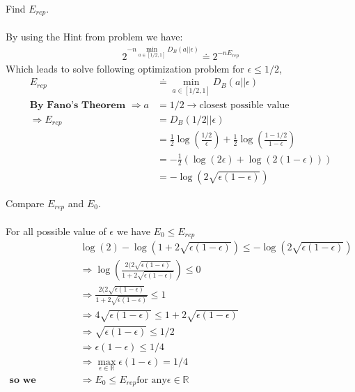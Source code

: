 \documentclass[
  course = {{EE623 Information Theory}},
  quartile = {{Fall 2020}},
  assignment = 8,
  name = {{Mohammad Mahdi Rahimi}},
  studentnumber = {{20208244}},
  email = {{mahi@kaist.ac.kr}},
  firstexercise = 1
]{aga-homework}
\begin{document}
\exercise
\subexercise Find $E_{rep}$.
\\\\
By using the Hint from problem we have:
\begin{equation} \label{eq1}
\begin{split}
2^{-n\min_{a \in [1/2, 1]} D_B(a||\epsilon)} \doteq 2^{-nE_{rep}}
\end{split}
\end{equation}
Which leads to solve following optimization problem for $\epsilon \le 1/2$, 
\begin{equation} \label{eq2}
\begin{split}
E_{rep} & \doteq \min_{a \in [1/2, 1]} D_B(a||\epsilon)\\
\textbf{By Fano's Theorem } \Rightarrow a & = 1/2 \rightarrow \text{closest possible value}\\
\Rightarrow E_{rep} & = D_B(1/2||\epsilon) \\
& = \frac{1}{2}\log{(\frac{1/2}{\epsilon})} + \frac{1}{2}\log{(\frac{1 - 1/2}{1 - \epsilon})}\\
& = -\frac{1}{2}(\log{(2\epsilon)} + \log{(2(1 - \epsilon))})\\
& = -\log{(2\sqrt{\epsilon(1 - \epsilon)})}
\end{split}
\end{equation}

\subexercise Compare $E_{rep}$ and $E_0$.
\\\\
For all possible value of $\epsilon$ we have $E_{0} \le E_{rep}$
\begin{equation} \label{eq3}
\begin{split}
&\log{(2)} - \log(1 + 2\sqrt{\epsilon(1 - \epsilon)}) \le -\log{(2\sqrt{\epsilon(1 - \epsilon)})}\\
& \Rightarrow \log(\frac{2(2\sqrt{\epsilon(1 - \epsilon)}}{1 + 2\sqrt{\epsilon(1 - \epsilon)}}) \le 0\\
& \Rightarrow \frac{2(2\sqrt{\epsilon(1 - \epsilon)}}{1 + 2\sqrt{\epsilon(1 - \epsilon)}} \le 1 \\
& \Rightarrow 4\sqrt{\epsilon(1 - \epsilon)} \le 1 + 2\sqrt{\epsilon(1 - \epsilon)} \\
& \Rightarrow \sqrt{\epsilon(1 - \epsilon)} \le 1/2 \\
& \Rightarrow \epsilon(1 - \epsilon) \le 1/4 \\
& \Rightarrow \max_{\epsilon \in \mathbb{R}}\epsilon(1 - \epsilon) = 1/4 \\
\textbf{so we proved}& \Rightarrow E_{0} \le E_{rep} \text{for any} \epsilon \in \mathbb{R}
\end{split}
\end{equation}
\end{document}

